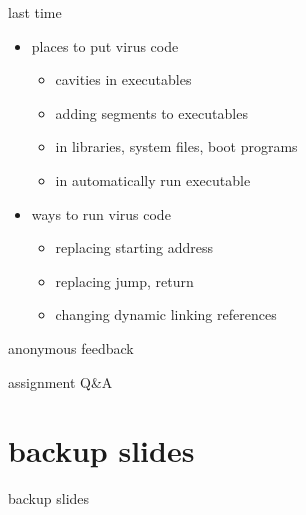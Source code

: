 \date{}
\title{}
\date{}

\begin{frame}
    \titlepage
\end{frame}



\begin{frame}{last time}
    \begin{itemize}
    \item places to put virus code
        \begin{itemize}
        \item cavities in executables
        \item adding segments to executables
        \item in libraries, system files, boot programs
        \item in automatically run executable
        \end{itemize}
    \item ways to run virus code
        \begin{itemize}
        \item replacing starting address
        \item replacing jump, return
        \item changing dynamic linking references
        \end{itemize}
    \end{itemize}
\end{frame}

\begin{frame}{anonymous feedback}
\end{frame}

\begin{frame}{assignment Q\&A}
\end{frame}



\section{backup slides}
\begin{frame}{backup slides}
\end{frame}


